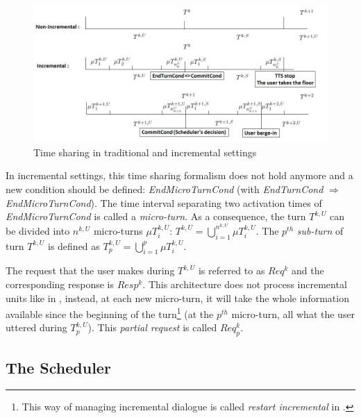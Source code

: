         \begin{figure}[t]
          \centering
          \includegraphics[scale=0.6]{figures/Timeline.jpg}
          \caption{Time sharing in traditional and incremental settings}
          \label{fig:timeshare}
        \end{figure}
        
        In incremental settings, this time sharing formalism does not hold anymore and a new condition should be defined: \textit{EndMicroTurnCond} (with \textit{EndTurnCond} $\Rightarrow$ \textit{EndMicroTurnCond}). The time interval separating two activation times of \textit{EndMicroTurnCond} is called a \textit{micro-turn}. As a consequence, the turn $T^{k,U}$ can be divided into $n^{k,U}$ micro-turns $\mu T^{k,U}_i$: $T^{k,U} = \bigcup_{i=1}^{n^{k,U}} \mu T^{k,U}_i$. The $p^{th}$ \textit{sub-turn} of turn $T^{k,U}$ is defined as $T^{k,U}_p = \bigcup_{i=1}^p \mu T^{k,U}_i$.
        
        The request that the user makes during $T^{k,U}$ is referred to as $Req^k$ and the corresponding response is $Resp^k$. This architecture does not process incremental units like in \cite{Schlangen2011}, instead, at each new micro-turn, it will take the whole information available since the beginning of the turn\footnote{This way of managing incremental dialogue is called \textit{restart incremental} in \cite{Schlangen2011}.} (at the $p^{th}$ micro-turn, all what the user uttered during $T^{k,U}_p$). This \textit{partial request} is called $Req^k_p$.
        
    \subsection{The Scheduler}
    
